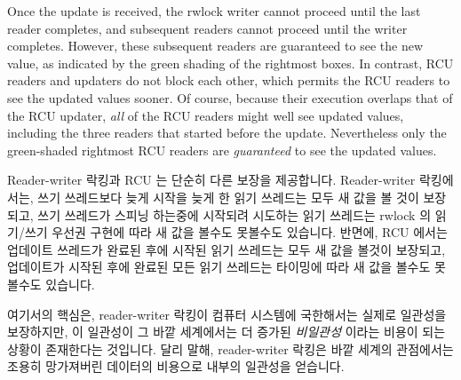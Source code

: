Once the update is received, the rwlock writer cannot proceed until the
last reader completes, and subsequent readers cannot proceed until the
writer completes.
However, these subsequent readers are guaranteed to see the new value,
as indicated by the green shading of the rightmost boxes.
In contrast, RCU readers and updaters do not block each other, which permits
the RCU readers to see the updated values sooner.
Of course, because their execution overlaps that of the RCU updater,
\emph{all} of the RCU readers might well see updated values, including
the three readers that started before the update.
Nevertheless only the green-shaded rightmost RCU readers
are \emph{guaranteed} to see the updated values.
\fi

Reader-writer 락킹과 RCU 는 단순히 다른 보장을 제공합니다.
Reader-writer 락킹에서는, 쓰기 쓰레드보다 늦게 시작을 늦게 한 읽기 쓰레드는
모두 새 값을 볼 것이 보장되고, 쓰기 쓰레드가 스피닝 하는중에 시작되려 시도하는
읽기 쓰레드는 rwlock 의 읽기/쓰기 우선권 구현에 따라 새 값을 볼수도 못볼수도
있습니다.
반면에, RCU 에서는 업데이트 쓰레드가 완료된 후에 시작된 읽기 쓰레드는 모두 새
값을 볼것이 보장되고, 업데이트가 시작된 후에 완료된 모든 읽기 쓰레드는 타이밍에
따라 새 값을 볼수도 못볼수도 있습니다.

여기서의 핵심은, reader-writer 락킹이 컴퓨터 시스템에 국한해서는 실제로
일관성을 보장하지만, 이 일관성이 그 바깥 세계에서는 더 증가된 \emph{비일관성}
이라는 비용이 되는 상황이 존재한다는 것입니다.
달리 말해, reader-writer 락킹은 바깥 세계의 관점에서는 조용히 망가져버린
데이터의 비용으로 내부의 일관성을 얻습니다.

